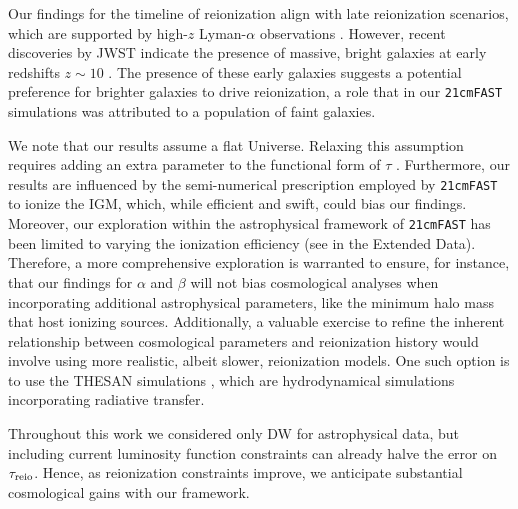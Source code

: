 Our findings for the timeline of reionization align with late
reionization scenarios, which are supported by high-$z$ Lyman-$\alpha$
observations \cite{Keating2020, Cain2021}.
However, recent discoveries by JWST indicate the presence of massive,
bright galaxies at early redshifts $z \sim 10$ \cite{Adams2023,
Bradley2023, Donnan2023}.
The presence of these early galaxies suggests a potential preference for
brighter galaxies to drive reionization, a role that in our
\texttt{21cmFAST} simulations was attributed to a population of faint
galaxies.

We note that our results assume a flat Universe.
Relaxing this assumption requires adding an extra parameter to the
functional form of $\tau$ \cite{Anselmi2023}.
Furthermore, our results are influenced by the semi-numerical
prescription employed by \texttt{21cmFAST} to ionize the IGM, which,
while efficient and swift, could bias our findings.
Moreover, our exploration within the astrophysical framework of
\texttt{21cmFAST} has been limited to varying the ionization efficiency
(see  in the Extended Data).
Therefore, a more comprehensive exploration is warranted to ensure, for
instance, that our findings for $\alpha$ and $\beta$ will not bias cosmological
analyses when incorporating additional astrophysical parameters, like
the minimum halo mass that host ionizing sources. 
Additionally, a valuable exercise to refine the inherent relationship
between cosmological parameters and reionization history would involve
using more realistic, albeit slower, reionization models.
One such option is to use the THESAN simulations \cite{Kannan2022},
which are hydrodynamical simulations incorporating radiative transfer.

Throughout this work we considered only DW for astrophysical data,
but including current luminosity function constraints can already halve
the error on $\tau_{\mathrm{reio}}$.
Hence, as reionization constraints improve, we anticipate substantial
cosmological gains with our framework.
